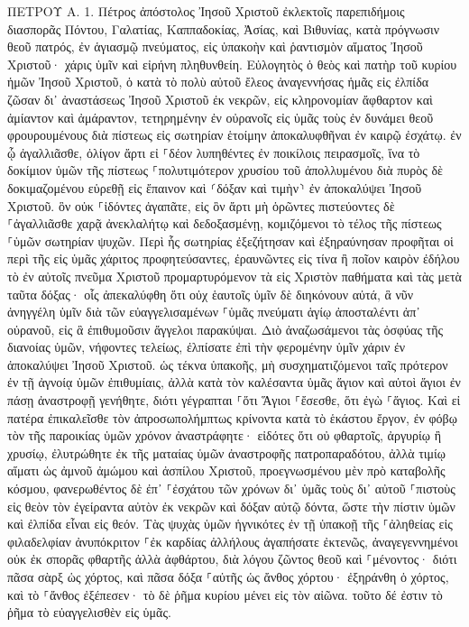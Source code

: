 \documentclass[twoside, 9pt]{extreport}
\begin{document}
ΠΕΤΡΟΥ Α.
1.
Πέτρος ἀπόστολος Ἰησοῦ Χριστοῦ ἐκλεκτοῖς παρεπιδήμοις διασπορᾶς Πόντου, Γαλατίας, Καππαδοκίας, Ἀσίας, καὶ Βιθυνίας, 
κατὰ πρόγνωσιν θεοῦ πατρός, ἐν ἁγιασμῷ πνεύματος, εἰς ὑπακοὴν καὶ ῥαντισμὸν αἵματος Ἰησοῦ Χριστοῦ· χάρις ὑμῖν καὶ εἰρήνη πληθυνθείη. 
Εὐλογητὸς ὁ θεὸς καὶ πατὴρ τοῦ κυρίου ἡμῶν Ἰησοῦ Χριστοῦ, ὁ κατὰ τὸ πολὺ αὐτοῦ ἔλεος ἀναγεννήσας ἡμᾶς εἰς ἐλπίδα ζῶσαν δι᾽ ἀναστάσεως Ἰησοῦ Χριστοῦ ἐκ νεκρῶν, 
εἰς κληρονομίαν ἄφθαρτον καὶ ἀμίαντον καὶ ἀμάραντον, τετηρημένην ἐν οὐρανοῖς εἰς ὑμᾶς 
τοὺς ἐν δυνάμει θεοῦ φρουρουμένους διὰ πίστεως εἰς σωτηρίαν ἑτοίμην ἀποκαλυφθῆναι ἐν καιρῷ ἐσχάτῳ. 
ἐν ᾧ ἀγαλλιᾶσθε, ὀλίγον ἄρτι εἰ ⸀δέον λυπηθέντες ἐν ποικίλοις πειρασμοῖς, 
ἵνα τὸ δοκίμιον ὑμῶν τῆς πίστεως ⸀πολυτιμότερον χρυσίου τοῦ ἀπολλυμένου διὰ πυρὸς δὲ δοκιμαζομένου εὑρεθῇ εἰς ἔπαινον καὶ ⸂δόξαν καὶ τιμὴν⸃ ἐν ἀποκαλύψει Ἰησοῦ Χριστοῦ. 
ὃν οὐκ ⸀ἰδόντες ἀγαπᾶτε, εἰς ὃν ἄρτι μὴ ὁρῶντες πιστεύοντες δὲ ⸀ἀγαλλιᾶσθε χαρᾷ ἀνεκλαλήτῳ καὶ δεδοξασμένῃ, 
κομιζόμενοι τὸ τέλος τῆς πίστεως ⸀ὑμῶν σωτηρίαν ψυχῶν. 
Περὶ ἧς σωτηρίας ἐξεζήτησαν καὶ ἐξηραύνησαν προφῆται οἱ περὶ τῆς εἰς ὑμᾶς χάριτος προφητεύσαντες, 
ἐραυνῶντες εἰς τίνα ἢ ποῖον καιρὸν ἐδήλου τὸ ἐν αὐτοῖς πνεῦμα Χριστοῦ προμαρτυρόμενον τὰ εἰς Χριστὸν παθήματα καὶ τὰς μετὰ ταῦτα δόξας· 
οἷς ἀπεκαλύφθη ὅτι οὐχ ἑαυτοῖς ὑμῖν δὲ διηκόνουν αὐτά, ἃ νῦν ἀνηγγέλη ὑμῖν διὰ τῶν εὐαγγελισαμένων ⸀ὑμᾶς πνεύματι ἁγίῳ ἀποσταλέντι ἀπ᾽ οὐρανοῦ, εἰς ἃ ἐπιθυμοῦσιν ἄγγελοι παρακύψαι. 
Διὸ ἀναζωσάμενοι τὰς ὀσφύας τῆς διανοίας ὑμῶν, νήφοντες τελείως, ἐλπίσατε ἐπὶ τὴν φερομένην ὑμῖν χάριν ἐν ἀποκαλύψει Ἰησοῦ Χριστοῦ. 
ὡς τέκνα ὑπακοῆς, μὴ συσχηματιζόμενοι ταῖς πρότερον ἐν τῇ ἀγνοίᾳ ὑμῶν ἐπιθυμίαις, 
ἀλλὰ κατὰ τὸν καλέσαντα ὑμᾶς ἅγιον καὶ αὐτοὶ ἅγιοι ἐν πάσῃ ἀναστροφῇ γενήθητε, 
διότι γέγραπται ⸀ὅτι Ἅγιοι ⸀ἔσεσθε, ὅτι ἐγὼ ⸀ἅγιος. 
Καὶ εἰ πατέρα ἐπικαλεῖσθε τὸν ἀπροσωπολήμπτως κρίνοντα κατὰ τὸ ἑκάστου ἔργον, ἐν φόβῳ τὸν τῆς παροικίας ὑμῶν χρόνον ἀναστράφητε· 
εἰδότες ὅτι οὐ φθαρτοῖς, ἀργυρίῳ ἢ χρυσίῳ, ἐλυτρώθητε ἐκ τῆς ματαίας ὑμῶν ἀναστροφῆς πατροπαραδότου, 
ἀλλὰ τιμίῳ αἵματι ὡς ἀμνοῦ ἀμώμου καὶ ἀσπίλου Χριστοῦ, 
προεγνωσμένου μὲν πρὸ καταβολῆς κόσμου, φανερωθέντος δὲ ἐπ᾽ ⸀ἐσχάτου τῶν χρόνων δι᾽ ὑμᾶς 
τοὺς δι᾽ αὐτοῦ ⸀πιστοὺς εἰς θεὸν τὸν ἐγείραντα αὐτὸν ἐκ νεκρῶν καὶ δόξαν αὐτῷ δόντα, ὥστε τὴν πίστιν ὑμῶν καὶ ἐλπίδα εἶναι εἰς θεόν. 
Τὰς ψυχὰς ὑμῶν ἡγνικότες ἐν τῇ ὑπακοῇ τῆς ⸀ἀληθείας εἰς φιλαδελφίαν ἀνυπόκριτον ⸀ἐκ καρδίας ἀλλήλους ἀγαπήσατε ἐκτενῶς, 
ἀναγεγεννημένοι οὐκ ἐκ σπορᾶς φθαρτῆς ἀλλὰ ἀφθάρτου, διὰ λόγου ζῶντος θεοῦ καὶ ⸀μένοντος· 
διότι πᾶσα σὰρξ ὡς χόρτος, καὶ πᾶσα δόξα ⸀αὐτῆς ὡς ἄνθος χόρτου· ἐξηράνθη ὁ χόρτος, καὶ τὸ ⸀ἄνθος ἐξέπεσεν· 
τὸ δὲ ῥῆμα κυρίου μένει εἰς τὸν αἰῶνα. τοῦτο δέ ἐστιν τὸ ῥῆμα τὸ εὐαγγελισθὲν εἰς ὑμᾶς. 
\end{document}

